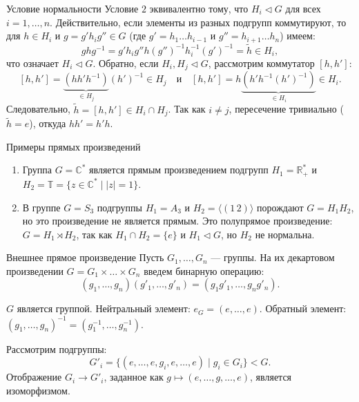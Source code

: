 \begin{Remark}{Условие нормальности}{}
	Условие $2$ эквивалентно тому, что $H_i \triangleleft G$ для всех $i = 1, \dots, n$. Действительно, если элементы из разных подгрупп коммутируют, то для $h \in H_i$ и $g = g' h_i g'' \in G$ (где $g' = h_1 \dots h_{i-1}$ и $g'' = h_{i+1} \dots h_n$) имеем:
	\[
	ghg^{-1} = g' h_i g'' h (g'')^{-1} h_i^{-1} (g')^{-1} = \widetilde{h} \in H_i,
	\]
	что означает $H_i \triangleleft G$. Обратно, если $H_i, H_j \triangleleft G$, рассмотрим коммутатор $[h, h']$:
	\[
	[h, h'] = \underbrace{(h h' h^{-1})}_{\in H_j} (h')^{-1} \in H_j \quad \text{и} \quad [h, h'] = h \underbrace{(h' h^{-1} (h')^{-1})}_{\in H_i} \in H_i.
	\]
	Следовательно, $\widetilde{h} = [h, h'] \in H_i \cap H_j$. Так как $i \neq j$, пересечение тривиально ($\widetilde{h} = e$), откуда $hh' = h'h$.
\end{Remark}

\begin{Example}{Примеры прямых произведений}{}
	\begin{enumerate}
		\item Группа $G = \mathbb{C}^*$ является прямым произведением подгрупп $H_1 = \mathbb{R}^*_+$ и $H_2 = \mathbb{T} = \{ z \in \mathbb{C}^* \mid |z| = 1 \}$.
		\item В группе $G = S_3$ подгруппы $H_1 = A_3$ и $H_2 = \langle(1\,2)\rangle$ порождают $G = H_1 H_2$, но это произведение не является прямым. Это полупрямое произведение: $G = H_1 \rtimes H_2$, так как $H_1 \cap H_2 = \{e\}$ и $H_1 \triangleleft G$, но $H_2$ не нормальна.
	\end{enumerate}
\end{Example}

\begin{Definition}{Внешнее прямое произведение}{}
	Пусть $G_1, \dots, G_n$ --- группы. На их декартовом произведении $G = G_1 \times \dots \times G_n$ введем бинарную операцию:
	\[
	(g_1, \dots, g_n)(g'_1, \dots, g'_n) = (g_1 g'_1, \dots, g_n g'_n).
	\]
\end{Definition}

\begin{Statement}{}{}
	$G$ является группой. Нейтральный элемент: $e_G = (e, \dots, e)$. Обратный элемент: $(g_1, \dots, g_n)^{-1} = (g_1^{-1}, \dots, g_n^{-1})$.
\end{Statement}

Рассмотрим подгруппы:
\[
G'_i = \{ (e, \dots, e, g_i, e, \dots, e) \mid g_i \in G_i \} < G.
\]
Отображение $G_i \to G'_i$, заданное как $g \mapsto (e, \dots, g, \dots, e)$, является изоморфизмом.

